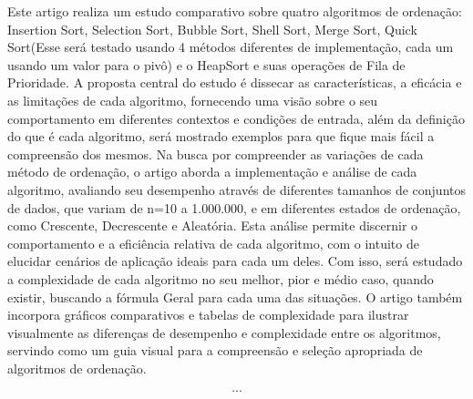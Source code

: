 \qquad Este artigo realiza um estudo comparativo sobre quatro algoritmos de ordenação: Insertion Sort, Selection Sort, Bubble Sort, Shell Sort, Merge Sort, Quick Sort(Esse será testado usando 4 métodos diferentes de implementação, cada um usando um valor para o pivô) e o HeapSort e suas operações de Fila de Prioridade. A proposta central do estudo é dissecar as características, a eficácia e as limitações de cada algoritmo, fornecendo uma visão sobre o seu comportamento em diferentes contextos e condições de entrada, além da definição do que é cada algoritmo, será mostrado exemplos para que fique mais fácil a compreensão dos mesmos. Na busca por compreender as variações de cada método de ordenação, o artigo aborda a implementação e análise de cada algoritmo, avaliando seu desempenho através de diferentes tamanhos de conjuntos de dados, que variam de n=10 a 1.000.000, e em diferentes estados de ordenação, como Crescente, Decrescente e Aleatória. Esta análise permite discernir o comportamento e a eficiência relativa de cada algoritmo, com o intuito de elucidar cenários de aplicação ideais para cada um deles. Com isso, será estudado a complexidade de cada algoritmo no seu melhor, pior e médio caso, quando existir, buscando a fórmula Geral para cada uma das situações. O artigo também incorpora gráficos comparativos e tabelas de complexidade para ilustrar visualmente as diferenças de desempenho e complexidade entre os algoritmos, servindo como um guia visual para a compreensão e seleção apropriada de algoritmos de ordenação.

\[...\]